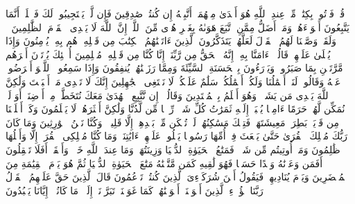 \startbuffer[\q:28:49]
قُلۡ فَأۡتُوا۟ بِكِتَٰبࣲ مِّنۡ عِندِ ٱللَّهِ هُوَ أَهۡدَىٰ مِنۡهُمَاۤ أَتَّبِعۡهُ إِن كُنتُمۡ صَٰدِقِینَ%
\stopbuffer%
\startbuffer[\q:28:50]
فَإِن لَّمۡ یَسۡتَجِیبُوا۟ لَكَ فَٱعۡلَمۡ أَنَّمَا یَتَّبِعُونَ أَهۡوَاۤءَهُمۡۚ وَمَنۡ أَضَلُّ مِمَّنِ ٱتَّبَعَ هَوَىٰهُ بِغَیۡرِ هُدࣰى مِّنَ ٱللَّهِۚ إِنَّ ٱللَّهَ لَا یَهۡدِی ٱلۡقَوۡمَ ٱلظَّٰلِمِینَ%
\stopbuffer%
\startbuffer[\q:28:51]
۞ وَلَقَدۡ وَصَّلۡنَا لَهُمُ ٱلۡقَوۡلَ لَعَلَّهُمۡ یَتَذَكَّرُونَ%
\stopbuffer%
\startbuffer[\q:28:52]
ٱلَّذِینَ ءَاتَیۡنَٰهُمُ ٱلۡكِتَٰبَ مِن قَبۡلِهِۦ هُم بِهِۦ یُؤۡمِنُونَ%
\stopbuffer%
\startbuffer[\q:28:53]
وَإِذَا یُتۡلَىٰ عَلَیۡهِمۡ قَالُوۤا۟ ءَامَنَّا بِهِۦۤ إِنَّهُ ٱلۡحَقُّ مِن رَّبِّنَاۤ إِنَّا كُنَّا مِن قَبۡلِهِۦ مُسۡلِمِینَ%
\stopbuffer%
\startbuffer[\q:28:54]
أُو۟لَٰۤئِكَ یُؤۡتَوۡنَ أَجۡرَهُم مَّرَّتَیۡنِ بِمَا صَبَرُوا۟ وَیَدۡرَءُونَ بِٱلۡحَسَنَةِ ٱلسَّیِّئَةَ وَمِمَّا رَزَقۡنَٰهُمۡ یُنفِقُونَ%
\stopbuffer%
\startbuffer[\q:28:55]
وَإِذَا سَمِعُوا۟ ٱللَّغۡوَ أَعۡرَضُوا۟ عَنۡهُ وَقَالُوا۟ لَنَاۤ أَعۡمَٰلُنَا وَلَكُمۡ أَعۡمَٰلُكُمۡ سَلَٰمٌ عَلَیۡكُمۡ لَا نَبۡتَغِی ٱلۡجَٰهِلِینَ%
\stopbuffer%
\startbuffer[\q:28:56]
إِنَّكَ لَا تَهۡدِی مَنۡ أَحۡبَبۡتَ وَلَٰكِنَّ ٱللَّهَ یَهۡدِی مَن یَشَاۤءُۚ وَهُوَ أَعۡلَمُ بِٱلۡمُهۡتَدِینَ%
\stopbuffer%
\startbuffer[\q:28:57]
وَقَالُوۤا۟ إِن نَّتَّبِعِ ٱلۡهُدَىٰ مَعَكَ نُتَخَطَّفۡ مِنۡ أَرۡضِنَاۤۚ أَوَ لَمۡ نُمَكِّن لَّهُمۡ حَرَمًا ءَامِنࣰا یُجۡبَىٰۤ إِلَیۡهِ ثَمَرَٰتُ كُلِّ شَیۡءࣲ رِّزۡقࣰا مِّن لَّدُنَّا وَلَٰكِنَّ أَكۡثَرَهُمۡ لَا یَعۡلَمُونَ%
\stopbuffer%
\startbuffer[\q:28:58]
وَكَمۡ أَهۡلَكۡنَا مِن قَرۡیَةِۭ بَطِرَتۡ مَعِیشَتَهَاۖ فَتِلۡكَ مَسَٰكِنُهُمۡ لَمۡ تُسۡكَن مِّنۢ بَعۡدِهِمۡ إِلَّا قَلِیلࣰاۖ وَكُنَّا نَحۡنُ ٱلۡوَٰرِثِینَ%
\stopbuffer%
\startbuffer[\q:28:59]
وَمَا كَانَ رَبُّكَ مُهۡلِكَ ٱلۡقُرَىٰ حَتَّىٰ یَبۡعَثَ فِیۤ أُمِّهَا رَسُولࣰا یَتۡلُوا۟ عَلَیۡهِمۡ ءَایَٰتِنَاۚ وَمَا كُنَّا مُهۡلِكِی ٱلۡقُرَىٰۤ إِلَّا وَأَهۡلُهَا ظَٰلِمُونَ%
\stopbuffer%
\startbuffer[\q:28:60]
وَمَاۤ أُوتِیتُم مِّن شَیۡءࣲ فَمَتَٰعُ ٱلۡحَیَوٰةِ ٱلدُّنۡیَا وَزِینَتُهَاۚ وَمَا عِندَ ٱللَّهِ خَیۡرࣱ وَأَبۡقَىٰۤۚ أَفَلَا تَعۡقِلُونَ%
\stopbuffer%
\startbuffer[\q:28:61]
أَفَمَن وَعَدۡنَٰهُ وَعۡدًا حَسَنࣰا فَهُوَ لَٰقِیهِ كَمَن مَّتَّعۡنَٰهُ مَتَٰعَ ٱلۡحَیَوٰةِ ٱلدُّنۡیَا ثُمَّ هُوَ یَوۡمَ ٱلۡقِیَٰمَةِ مِنَ ٱلۡمُحۡضَرِینَ%
\stopbuffer%
\startbuffer[\q:28:62]
وَیَوۡمَ یُنَادِیهِمۡ فَیَقُولُ أَیۡنَ شُرَكَاۤءِیَ ٱلَّذِینَ كُنتُمۡ تَزۡعُمُونَ%
\stopbuffer%
\startbuffer[\q:28:63]
قَالَ ٱلَّذِینَ حَقَّ عَلَیۡهِمُ ٱلۡقَوۡلُ رَبَّنَا هَٰۤؤُلَاۤءِ ٱلَّذِینَ أَغۡوَیۡنَاۤ أَغۡوَیۡنَٰهُمۡ كَمَا غَوَیۡنَاۖ تَبَرَّأۡنَاۤ إِلَیۡكَۖ مَا كَانُوۤا۟ إِیَّانَا یَعۡبُدُونَ%
